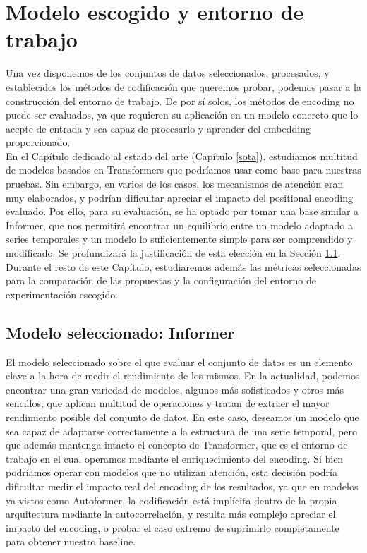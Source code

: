 \chapter{Modelo escogido y entorno de trabajo}
\label{cap5}

Una vez disponemos de los conjuntos de datos seleccionados, procesados, y establecidos los métodos de codificación que queremos probar, podemos pasar a la construcción del entorno de trabajo. De por sí solos, los métodos de encoding no puede ser evaluados, ya que requieren su aplicación en un modelo concreto que lo acepte de entrada y sea capaz de procesarlo y aprender del embedding proporcionado.\\

En el Capítulo dedicado al estado del arte (Capítulo \ref{sota}), estudiamos multitud de modelos basados en Transformers que podríamos usar como base para nuestras pruebas. Sin embargo, en varios de los casos, los mecanismos de atención eran muy elaborados, y podrían dificultar apreciar el impacto del positional encoding evaluado. Por ello, para su evaluación, se ha optado por tomar una base similar a Informer, que nos permitirá encontrar un equilibrio entre un modelo adaptado a series temporales y un modelo lo suficientemente simple para ser comprendido y modificado. Se profundizará la justificación de esta elección en la Sección \ref{modelo}.\\

Durante el resto de este Capítulo, estudiaremos además las métricas seleccionadas para la comparación de las propuestas y la configuración del entorno de experimentación escogido.

\section{Modelo seleccionado: Informer}
\label{modelo}

El modelo seleccionado sobre el que evaluar el conjunto de datos es un elemento clave a la hora de medir el rendimiento de los mismos. En la actualidad, podemos encontrar una gran variedad de modelos, algunos más sofisticados y otros más sencillos, que aplican multitud de operaciones y tratan de extraer el mayor rendimiento posible del conjunto de datos. En este caso, deseamos un modelo que sea capaz de adaptarse correctamente a la estructura de una serie temporal, pero que además mantenga intacto el concepto de Transformer, que es el entorno de trabajo en el cual operamos mediante el enriquecimiento del encoding. Si bien podríamos operar con modelos que no utilizan atención, esta decisión podría dificultar medir el impacto real del encoding de los resultados, ya que en modelos ya vistos como Autoformer, la codificación está implícita dentro de la propia arquitectura mediante la autocorrelación, y resulta más complejo apreciar el impacto del encoding, o probar el caso extremo de suprimirlo completamente para obtener nuestro baseline.\\

